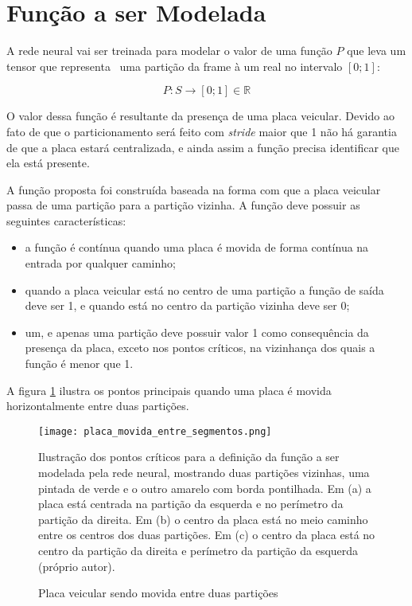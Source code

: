 \section{Função a ser Modelada} \label{ses:funcao_a_modelar}

A rede neural vai ser treinada para modelar o valor de uma função $P$ que
leva um tensor que representa  uma partição da frame à um real no intervalo
$[0;1]$:

\begin{equation}
	P:S \to [0;1] \in \mathbb{R} 
\end{equation}

O valor dessa função é resultante da presença de uma placa veicular. Devido ao
fato de que o particionamento será feito com \emph{stride} maior que 1 não há
garantia de que a placa estará centralizada, e ainda assim a função precisa
identificar que ela está presente.

A função proposta foi construída baseada na forma com que a placa veicular
passa de uma partição para a partição vizinha. A função deve possuir as
seguintes características:

\begin{itemize}
\item a função é contínua quando uma placa é movida de forma contínua na
	entrada por qualquer caminho;
\item quando a placa veicular está no centro de uma partição a função de
	saída deve ser 1, e quando está no centro da partição vizinha deve ser 0;
\item um, e apenas uma partição deve possuir valor 1 como consequência da
	presença da placa, exceto nos pontos críticos, na vizinhança dos quais a
	função é menor que 1.
\end{itemize}

A figura \ref{fig:placa_movida_entre_segmentos} ilustra os pontos principais
quando uma placa é movida horizontalmente entre duas partições.

\begin{figure}[!htb]
	\centering
	\texttt{[image: placa\_movida\_entre\_segmentos.png]}
	\caption{Placa veicular sendo movida entre duas partições}
	\label{fig:placa_movida_entre_segmentos}
	Ilustração dos pontos críticos para a definição da função a ser modelada
	pela rede neural, mostrando duas partições vizinhas, uma pintada de verde e
	o outro amarelo com borda pontilhada. Em (a) a placa está centrada na
	partição da esquerda e no perímetro da partição da direita.
	Em (b) o centro da placa está no meio caminho entre os centros dos duas
	partições. Em (c) o centro da placa está no centro da partição da direita e
	perímetro da partição da esquerda (próprio autor).
\end{figure}

